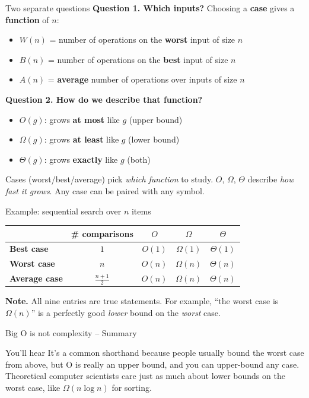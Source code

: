 \documentclass[10pt]{beamer}
\begin{document}
\begin{frame}{Two separate questions}
\colorbox{yellow!30}{\textbf{Question 1. Which inputs?}} \; Choosing a \textbf{case} gives a \textbf{function} of $n$:
\begin{itemize}
\item $W(n)$ = number of operations on the \textbf{worst} input of size $n$
\item $B(n)$ = number of operations on the \textbf{best} input of size $n$
\item $A(n)$ = \textbf{average} number of operations over inputs of size $n$
\end{itemize}
\vfill
\pause
\colorbox{green!30}{\textbf{Question 2. How do we describe that function?}}
\begin{itemize}
\item $O(g)$: grows \textbf{at most} like $g$ \quad (upper bound)
\item $\Omega(g)$: grows \textbf{at least} like $g$ \quad (lower bound)
\item $\Theta(g)$: grows \textbf{exactly} like $g$ \quad (both)
\end{itemize}
\vfill
\pause
\begin{mybluebox}[title=\text{Take-away}]
Cases (worst/best/average) pick \textit{which function} to study.  $O$, $\Omega$, $\Theta$ describe \textit{how fast it grows}.  Any case can be paired with any symbol.
\end{mybluebox}
\end{frame}

\begin{frame}{Example: sequential search over $n$ items}
\centering
\begin{tabular}{l c | c c c}
 & \textbf{\# comparisons} & $O$ & $\Omega$ & $\Theta$ \\
\hline
\textbf{Best case}    & $1$ & $O(1)$ & $\Omega(1)$ & $\Theta(1)$ \\
\textbf{Worst case}   & $n$ & $O(n)$ & $\Omega(n)$ & $\Theta(n)$ \\
\textbf{Average case} & $\frac{n+1}{2}$ & $O(n)$ & $\Omega(n)$ & $\Theta(n)$
\end{tabular}

\vfill
\pause
\raggedright
\colorbox{red!30}{\textbf{Note.}} All nine entries are true statements.  For example, ``the worst case is $\Omega(n)$'' is a perfectly good \textit{lower} bound on the \textit{worst} case.
\end{frame}

\begin{frame}{Big O is not  complexity  -- Summary}

You’ll hear  It’s a common shorthand because people usually bound the worst case from above, but O is really an upper bound, and you can upper-bound any case. 
\vfill 
Theoretical computer scientists care just as much about lower bounds on the worst case, like $\Omega(n  \log n)$ for sorting.

	
\end{frame}
\end{document}
